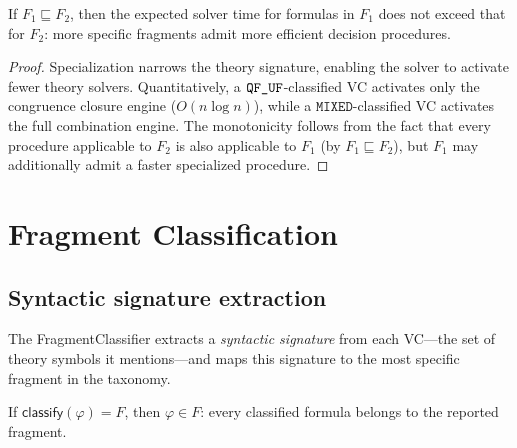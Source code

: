\documentclass[11pt]{article}
\begin{document}
\begin{lemma}%
\label{lem:monotone-cost}
If $F_1 \sqsubseteq F_2$, then the expected solver time
for formulas in $F_1$ does not exceed that for $F_2$:
more specific fragments admit more efficient decision
procedures.
\end{lemma}

\begin{proof}
Specialization narrows the theory signature, enabling the
solver to activate fewer theory solvers.  Quantitatively,
a $\texttt{QF\_UF}$-classified VC activates only the congruence
closure engine ($O(n \log n)$), while a $\texttt{MIXED}$-classified
VC activates the full combination engine.  The monotonicity
follows from the fact that every procedure applicable to $F_2$
is also applicable to $F_1$ (by $F_1 \sqsubseteq F_2$), but
$F_1$ may additionally admit a faster specialized procedure.
\end{proof}


\section{Fragment Classification}\label{sec:classification}

\subsection{Syntactic signature extraction}

The FragmentClassifier extracts a \emph{syntactic signature}
from each VC---the set of theory symbols it mentions---and
maps this signature to the most specific fragment in the taxonomy.

\begin{theorem}\label{thm:classify-sound}
If $\mathsf{classify}(\varphi) = F$, then $\varphi \in F$:
every classified formula belongs to the reported fragment.
\end{theorem}
\end{document}
